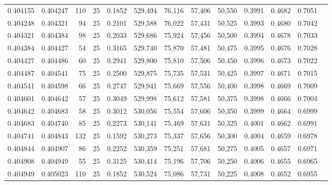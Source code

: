 \begin{tabular}{rrrrrrrrrrrrr}
0.404155 & 0.404247 &   110 &  25 &                                     0.1852 & 529,494 &  76,116 &  57,406 &  50,550 & 0.3991 & 0.4682 & 0.7051 \\
0.404248 & 0.404321 &    94 &  25 &                                     0.2101 & 529,588 &  76,022 &  57,431 &  50,525 & 0.3993 & 0.4680 & 0.7042 \\
0.404321 & 0.404384 &    98 &  25 &                                     0.2033 & 529,686 &  75,924 &  57,456 &  50,500 & 0.3994 & 0.4678 & 0.7033 \\
0.404384 & 0.404427 &    54 &  25 &                                     0.3165 & 529,740 &  75,870 &  57,481 &  50,475 & 0.3995 & 0.4676 & 0.7028 \\
0.404427 & 0.404486 &    60 &  25 &                                     0.2941 & 529,800 &  75,810 &  57,506 &  50,450 & 0.3996 & 0.4673 & 0.7022 \\
0.404487 & 0.404541 &    75 &  25 &                                     0.2500 & 529,875 &  75,735 &  57,531 &  50,425 & 0.3997 & 0.4671 & 0.7015 \\
0.404541 & 0.404598 &    66 &  25 &                                     0.2747 & 529,941 &  75,669 &  57,556 &  50,400 & 0.3998 & 0.4669 & 0.7009 \\
0.404601 & 0.404642 &    57 &  25 &                                     0.3049 & 529,998 &  75,612 &  57,581 &  50,375 & 0.3998 & 0.4666 & 0.7004 \\
0.404642 & 0.404683 &    58 &  25 &                                     0.3012 & 530,056 &  75,554 &  57,606 &  50,350 & 0.3999 & 0.4664 & 0.6999 \\
0.404683 & 0.404740 &    85 &  25 &                                     0.2273 & 530,141 &  75,469 &  57,631 &  50,325 & 0.4001 & 0.4662 & 0.6991 \\
0.404741 & 0.404843 &   132 &  25 &                                     0.1592 & 530,273 &  75,337 &  57,656 &  50,300 & 0.4004 & 0.4659 & 0.6978 \\
0.404844 & 0.404907 &    86 &  25 &                                     0.2252 & 530,359 &  75,251 &  57,681 &  50,275 & 0.4005 & 0.4657 & 0.6971 \\
0.404908 & 0.404949 &    55 &  25 &                                     0.3125 & 530,414 &  75,196 &  57,706 &  50,250 & 0.4006 & 0.4655 & 0.6965 \\
0.404949 & 0.405023 &   110 &  25 &                                     0.1852 & 530,524 &  75,086 &  57,731 &  50,225 & 0.4008 & 0.4652 & 0.6955 \\

\end{tabular}
